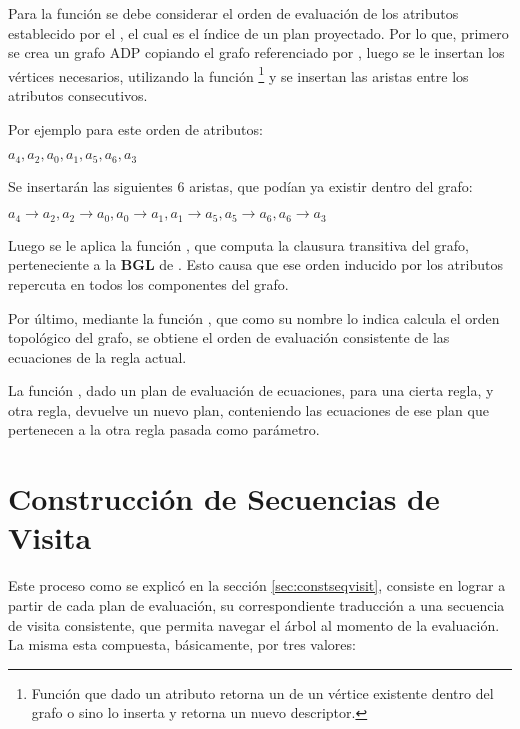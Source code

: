 Para la función  se debe considerar el orden de evaluación de los atributos establecido por el , el cual es el índice de un plan proyectado. Por lo que, primero se crea un grafo ADP copiando el grafo referenciado por , luego se le insertan los vértices necesarios, utilizando la función \footnote{Función que dado un atributo retorna un  de un vértice existente dentro del grafo o sino lo inserta y retorna un nuevo descriptor.} y se insertan las aristas entre los atributos consecutivos.

Por ejemplo para este orden de atributos:
\vspace{0.1cm}
\begin{center}
\Large\textbf{$a_{4}, a_{2}, a_{0}, a_{1}, a_{5}, a_{6}, a_{3}$}
\end{center}
\vspace{0.2cm}
Se insertarán las siguientes 6 aristas, que podían ya existir dentro del grafo:
\vspace{0.1cm}
\begin{center}
\Large\textbf{$a_{4} \rightarrow a_{2}, a_{2} \rightarrow a_{0}, a_{0} \rightarrow a_{1}, a_{1} \rightarrow a_{5}, a_{5} \rightarrow a_{6}, a_{6} \rightarrow a_{3}$}
\end{center}
\vspace{0.2cm}

Luego se le aplica la función , que computa la clausura transitiva del grafo, perteneciente a la \textbf{BGL} de \boost. Esto causa que ese orden inducido por los atributos repercuta en todos los componentes del grafo.

Por último, mediante la función , que como su nombre lo indica calcula el orden topológico del grafo, se obtiene el orden de evaluación consistente de las ecuaciones de la regla actual.

La función , dado un plan de evaluación de ecuaciones, para una cierta regla, y otra regla, devuelve un nuevo plan, conteniendo las ecuaciones de ese plan que pertenecen a la otra regla pasada como parámetro.

\section{Construcción de Secuencias de Visita}

Este proceso como se explicó en la sección \ref{sec:constseqvisit}, consiste en lograr a partir de cada plan de evaluación, su correspondiente traducción a una secuencia de visita consistente, que permita navegar el árbol al momento de la evaluación. La misma esta compuesta, básicamente, por tres valores:

